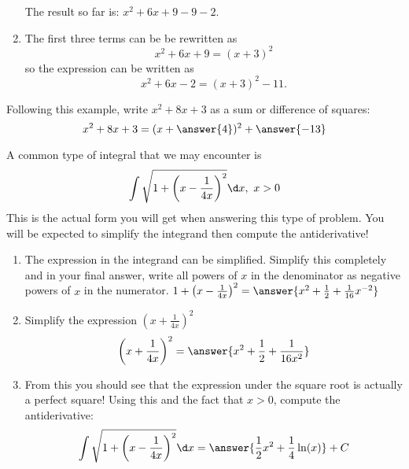 \documentclass{ximera}
\begin{document}
\begin{exercise}
\begin{problem}
\begin{enumerate}
      The result so far is: $x^2 + 6x + 9 - 9 - 2$.
      
    \item The first three terms can be be rewritten as 
      \[
        x^2 + 6x + 9 = (x + 3)^2
      \]
      so the expression can be written as
      \[
        x^2 + 6x - 2 = (x+3)^2 - 11.
      \]
  \end{enumerate}
  
 
    Following this example, write $x^2 + 8x + 3$ as a sum or difference of squares:
    \[
      x^2 + 8x + 3 = (x + \answer{4})^2 + \answer{-13}
    \]  
\end{problem}

\begin{problem}
  A common type of integral that we may encounter is
  \[
    \int \sqrt{1 + \left(x - \frac{1}{4x} \right)^2} \d x, \text{ $x > 0$}
  \]
  This is the actual form you will get when answering this type of problem.
  You will be expected to simplify the integrand then compute the antiderivative!
  
  \begin{enumerate}
    \item The expression in the integrand can be simplified.
      Simplify this completely and in your final answer, write all powers of $x$ in the denominator as negative powers of $x$ in the numerator.
      $1 + \left(x - \frac{1}{4x}\right)^2 = \answer{x^2 + \frac{1}{2} + \frac{1}{16} x^{-2}}$
    \item Simplify the expression $\left( x + \frac{1}{4x} \right)^2$
    \[
       \left( x + \frac{1}{4x} \right)^2 = \answer{x^2 + \frac{1}{2} + \frac{1}{16x^2}}
    \]
    \item From this you should see that the expression under the square root is actually a perfect square!
      Using this and the fact that $x > 0$, compute the antiderivative:
      \[
        \int \sqrt{1 + \left( x - \frac{1}{4x} \right)^2} \d x = \answer{\frac{1}{2}x^2 + \frac{1}{4} \ln(x)} + C
      \]
  \end{enumerate}
\end{problem}


\end{exercise}
\end{document}
